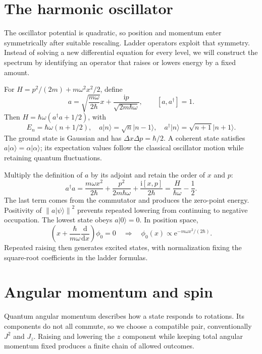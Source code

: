 \documentclass[11pt,oneside]{book}
\newcommand{\dd}{\mathrm{d}}
\newcommand{\ii}{\mathrm{i}}
\newcommand{\ee}{\mathrm{e}}
\newcommand{\ket}[1]{\lvert #1\rangle}
\newcommand{\norm}[1]{\left\lVert #1\right\rVert}
\newcommand{\od}[2]{\frac{\dd #1}{\dd #2}}
\theoremstyle{reviewstyle}
\begin{document}
\section{The harmonic oscillator}
The oscillator potential is quadratic, so position and momentum enter symmetrically after suitable rescaling. Ladder operators exploit that symmetry. Instead of solving a new differential equation for every level, we will construct the spectrum by identifying an operator that raises or lowers energy by a fixed amount.

For $H=p^2/(2m)+m\omega^2x^2/2$, define
\begin{equation}a=\sqrt{\frac{m\omega}{2\hbar}}x+\frac{\ii p}{\sqrt{2m\hbar\omega}},\qquad [a,a^\dagger]=1.\end{equation}
Then $H=\hbar\omega(a^\dagger a+1/2)$, with
\begin{equation}E_n=\hbar\omega(n+1/2),\quad a\ket n=\sqrt n\ket{n-1},\quad a^\dagger\ket n=\sqrt{n+1}\ket{n+1}.\end{equation}
The ground state is Gaussian and has $\Delta x\Delta p=\hbar/2$. A coherent state satisfies $a\ket\alpha=\alpha\ket\alpha$; its expectation values follow the classical oscillator motion while retaining quantum fluctuations.

Multiply the definition of $a$ by its adjoint and retain the order of $x$ and $p$:
\begin{equation}
a^\dagger a=\frac{m\omega x^2}{2\hbar}
+\frac{p^2}{2m\hbar\omega}+\frac{\ii[x,p]}{2\hbar}
=\frac H{\hbar\omega}-\frac12.
\end{equation}
The last term comes from the commutator and produces the zero-point energy. Positivity of $\norm{a\ket\psi}^2$ prevents repeated lowering from continuing to negative occupation. The lowest state obeys $a\ket0=0$. In position space,
\begin{equation}
\left(x+\frac{\hbar}{m\omega}\od{}{x}\right)\phi_0=0
\quad\Longrightarrow\quad
\phi_0(x)\propto\ee^{-m\omega x^2/(2\hbar)}.
\end{equation}
Repeated raising then generates excited states, with normalization fixing the square-root coefficients in the ladder formulas.

\section{Angular momentum and spin}
Quantum angular momentum describes how a state responds to rotations. Its components do not all commute, so we choose a compatible pair, conventionally $J^2$ and $J_z$. Raising and lowering the $z$ component while keeping total angular momentum fixed produces a finite chain of allowed outcomes.
\end{document}
